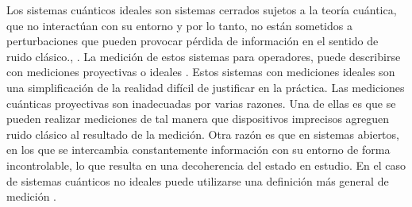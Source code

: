 Los sistemas cuánticos ideales son sistemas cerrados sujetos a la teoría
cuántica, que no interactúan con su entorno y por lo tanto, no están sometidos
a perturbaciones que pueden provocar pérdida de información en el sentido de ruido clásico., .
La medición de estos sistemas para operadores, puede describirse con mediciones
proyectivas o ideales . Estos sistemas con mediciones ideales son una
simplificación de la realidad difícil de justificar en la práctica. Las
mediciones cuánticas proyectivas son inadecuadas por varias razones. Una de
ellas es que se pueden realizar mediciones de tal manera que dispositivos
imprecisos agreguen ruido clásico al resultado de la medición. Otra razón es
que 
en sistemas abiertos, en los que se intercambia constantemente información con
su entorno de forma incontrolable, lo que resulta en una decoherencia del
estado en estudio. En el
caso de sistemas cuánticos no ideales puede utilizarse
una definición más general de medición {\cite{wilde2011classical,
jaeger2007quantum}}. 


